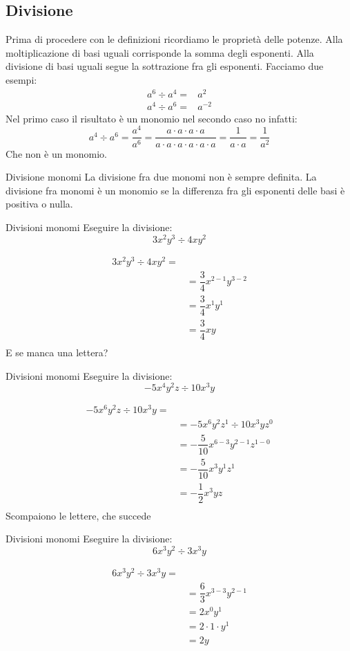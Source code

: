 \subsection{Divisione}
Prima di procedere con le definizioni ricordiamo le proprietà delle potenze. Alla moltiplicazione di basi uguali corrisponde la somma degli esponenti. Alla divisione di basi uguali segue la sottrazione fra gli esponenti. Facciamo due esempi:
\begin{align*}
	a^{6}\div a^4=&a^2\\
	a^4\div a^6= &a^{-2}
\end{align*}
Nel primo caso il risultato è un monomio nel secondo caso no infatti:
\[a^4\div a^6=\dfrac{a^4}{a^6}=\dfrac{a\cdot a\cdot a\cdot a}{a\cdot a\cdot a\cdot a\cdot a\cdot a}=\dfrac{1}{a\cdot a}=\dfrac{1}{a^2}\]
Che non è un monomio.
\begin{definizionet}{Divisione monomi}{}
La divisione fra due monomi non è sempre definita. La divisione fra monomi è un monomio se la differenza fra gli esponenti delle basi è positiva o nulla. 
\end{definizionet}
\begin{esempiot}{Divisioni monomi}{}
	Eseguire la divisione:
	\[ 3x^2y^3\div 4xy^2\]
\end{esempiot}
\begin{align*}
3x^2y^3\div 4xy^2=&\\
&=\dfrac{3}{4}x^{2-1}y^{3-2}\\
&=\dfrac{3}{4}x^{1}y^{1}\\
&=\dfrac{3}{4}xy\\
\end{align*}
E se manca una lettera?
\begin{esempiot}{Divisioni monomi}{}
	Eseguire la divisione:
	\[ -5x^4y^2z\div 10x^3y\]
\end{esempiot}
\begin{align*}
	-5x^6y^2z\div 10x^3y=&\\
	&=-5x^6y^2z^1\div 10x^3yz^0\\
	&=-\dfrac{5}{10}x^{6-3}y^{2-1}z^{1-0}\\
	&=-\dfrac{5}{10}x^{3}y^{1}z^{1}\\
	&=-\dfrac{1}{2}x^{3}yz\\
\end{align*}
Scompaiono le lettere, che succede
\begin{esempiot}{Divisioni monomi}{}
	Eseguire la divisione:
	\[ 6x^3y^2\div 3 x^3y\]
\end{esempiot}
\begin{align*}
	6x^3y^2\div 3 x^3y=&\\
	&=\dfrac{6}{3}x^{3-3}y^{2-1}\\
	&=2x^{0}y^{1}\\
	&=2\cdot 1\cdot y^{1}\\
	&=2y\\
\end{align*}
